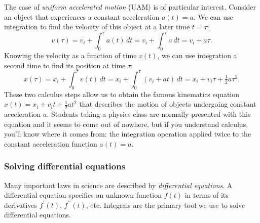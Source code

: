 			The case of \emph{uniform accelerated motion} (UAM) is of particular interest.
			Consider an object that experiences a constant acceleration $a(t) = a$.
			We can use integration to find the velocity of this object at a later time $t=\tau$:
			\[ 
				v(\tau)	= v_i + \int_0^\tau a(t)\,dt
						= v_i +  \int_0^\tau a \,dt
						= v_i + a\tau.
			\]
			Knowing the velocity as a function of time $v(t)$,
			we can use integration a second time to find its position at time $\tau$:
			\[
				x(\tau)	= x_i + \int_0^\tau v(t) \, dt
						= x_i +  \int_0^\tau (v_i+at) \, dt
						= x_i + v_i\tau + \tfrac{1}{2}a\tau^2.
			\]
			These two calculus steps
			allow us to obtain the famous kinematics equation
			$x(t) = x_i + v_it + \tfrac{1}{2}at^2$
			that describes the motion of objects undergoing constant acceleration $a$. %
			Students taking a physics class are normally presented with this equation
			and it seems to come out of nowhere,
			but if you understand calculus,
			you'll know where it comes from:
			the integration operation applied twice to the constant acceleration function $a(t) = a$.



		\subsubsection{Solving differential equations}

			Many important laws in science are described by \emph{differential equations}.
			A differential equation specifies an unknown function $f(t)$
			in terms of its derivatives $f^{\prime\!}(t)$, $f^{\prime\prime\!}(t)$, etc.
			Integrals are the primary tool we use to solve differential equations.

